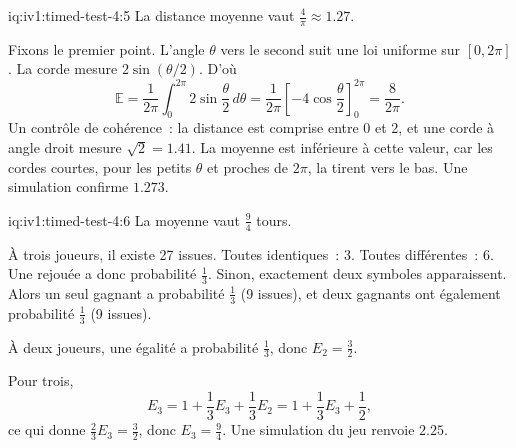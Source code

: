 \begin{solution}{iq:iv1:timed-test-4:5}
La distance moyenne vaut $\frac{4}{\pi} \approx 1.27$.

Fixons le premier point. L'angle $\theta$ vers le second suit une loi uniforme sur $[0, 2\pi]$. La corde mesure $2\sin(\theta/2)$. D'où
\[
\mathbb{E} = \frac{1}{2\pi}\int_0^{2\pi}2\sin\frac{\theta}{2}\,d\theta = \frac{1}{2\pi}\left[-4\cos\frac{\theta}{2}\right]_0^{2\pi} = \frac{8}{2\pi}.
\]
Un contrôle de cohérence~: la distance est comprise entre 0 et 2, et une corde à angle droit mesure $\sqrt{2} = 1.41$. La moyenne est inférieure à cette valeur, car les cordes courtes, pour les petits $\theta$ et proches de $2\pi$, la tirent vers le bas. Une simulation confirme $1.273$.

\end{solution}

\begin{solution}{iq:iv1:timed-test-4:6}
La moyenne vaut $\frac94$ tours.

À trois joueurs, il existe 27 issues. Toutes identiques~: 3. Toutes différentes~: 6. Une rejouée a donc probabilité $\frac13$. Sinon, exactement deux symboles apparaissent. Alors un seul gagnant a probabilité $\frac13$ (9 issues), et deux gagnants ont également probabilité $\frac13$ (9 issues).

À deux joueurs, une égalité a probabilité $\frac13$, donc $E_2 = \frac32$.

Pour trois,
\[
E_3 = 1 + \frac13E_3 + \frac13E_2 = 1 + \frac13E_3 + \frac12,
\]
ce qui donne $\frac23E_3 = \frac32$, donc $E_3 = \frac94$. Une simulation du jeu renvoie $2.25$.

\end{solution}

